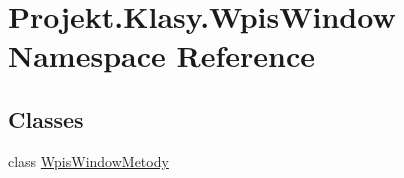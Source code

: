 \hypertarget{namespace_projekt_1_1_klasy_1_1_wpis_window}{}\section{Projekt.\+Klasy.\+Wpis\+Window Namespace Reference}
\label{namespace_projekt_1_1_klasy_1_1_wpis_window}
\subsection*{Classes}
\begin{DoxyCompactItemize}
\item 
class \mbox{\hyperlink{class_projekt_1_1_klasy_1_1_wpis_window_1_1_wpis_window_metody}{Wpis\+Window\+Metody}}
\end{DoxyCompactItemize}
